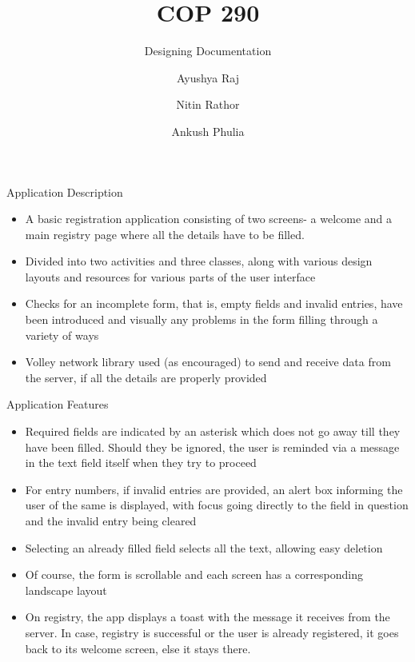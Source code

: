 \documentclass{beamer}
\title{COP 290}
\subtitle{Designing Documentation}
\author{Ayushya Raj \and Nitin Rathor \and Ankush Phulia}
\institute[IIT Delhi] 
{
  Department of Computer Science\\
  IIT Delhi}
\begin{document}
\begin{frame}
  \titlepage
\end{frame}

\begin{frame}{Application Description}{}
  \begin{itemize}
  \item {
   A basic registration application consisting of two screens- a welcome and a main registry page where all the details have to be filled.
  }
  \item {
    Divided into two activities and three classes, along with various design layouts and resources for various parts of the user interface
  }
  \item {
    Checks for an incomplete form, that is, empty fields and invalid entries, have been introduced and visually any problems in the form filling through a variety of ways
  }
  \item{
  Volley network library used (as encouraged) to send and receive data from the server, if all the details are properly provided
  }
  \end{itemize}
\end{frame}

\begin{frame}{Application Features}
  \begin{itemize}
  \item {
    Required fields are indicated by an asterisk which does not go away till they have been filled. Should they be ignored, the user is reminded via a message in the text field itself when they try to proceed
  }
  \item {   
    For entry numbers, if invalid entries are provided, an alert box informing the user of the same is displayed, with focus going directly to the field in question and the invalid entry being cleared
  }
  \item {
    Selecting an already filled field selects all the text, allowing easy deletion
  }
  \item {
    Of course, the form is scrollable and each screen has a corresponding landscape layout
  }
  \item {
    On registry, the app displays a toast with the message it receives from the server. In case, registry is successful or the user is already registered, it goes back to its welcome screen, else it stays there.
  }
  \end{itemize}
\end{frame}
\end{document}
